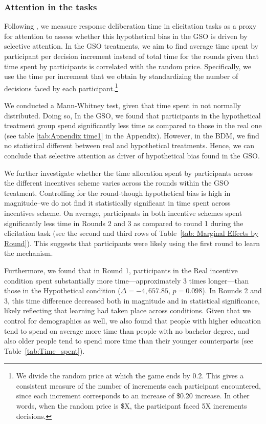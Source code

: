 \documentclass[12pt]{article}
\begin{document}
\subsubsection{Attention in the tasks}
\label{Sec: Attention}

Following \citet{chabris2008measuring}, we measure response deliberation time in elicitation tasks as a proxy for attention to assess whether this hypothetical bias in the GSO is driven by selective attention. In the GSO treatments, we aim to find average time spent by participant per decision increment instead of total time for the rounds given that time spent by participants is correlated with the random price. Specifically, we use the time per increment that we obtain by standardizing the number of decisions faced by each participant.\footnote{We divide the random price at which the game ends by 0.2. This gives a consistent measure of the number of increments each participant encountered, since each increment corresponds to an increase of \$0.20 increase. In other words, when the random price is \$X, the participant faced 5X increments decisions.} 

We conducted a Mann-Whitney test, given that time spent in not normally distributed. Doing so, In the GSO, we found that participants in the hypothetical treatment group spend significantly less time as compared to those in the real one (see table \ref{tab:Appendix time1} in the Appendix). However, in the BDM, we find no statistical different between real and hypothetical treatments. Hence, we can conclude that selective attention as driver of hypothetical bias found in the GSO. 

We further investigate whether the time allocation spent by participants across the different incentives scheme varies  across the rounds within the GSO treatment. Controlling for the round-though hypothetical bias is high in magnitude--we do not find it statistically significant in time spent across incentives scheme. On average, participants in both incentive schemes spent significantly less time in Rounds 2 and 3 as compared to round 1 during the elicitation task (see the second and third rows of Table~\ref{tab: Marginal Effects by Round}). This suggests that participants were likely using the first round to learn the mechanism.

Furthermore, we found that in Round 1, participants in the Real incentive condition spent substantially more time—approximately 3 times longer—than those in the Hypothetical condition (\(\Delta = -4,657.85\), \(p = 0.098\)). In Rounds 2 and 3, this time difference decreased both in magnitude and in statistical significance, likely reflecting that learning had taken place across conditions. Given that we control for demographics as well, we also found that people with higher education tend to spend on average more time than people with no bachelor degree, and also older people tend to spend more time than their younger counterparts (see Table~\ref{tab:Time_spent}). 
\end{document}
